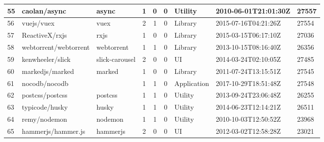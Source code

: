\begin{landscape}
\begin{table}[]
{\begin{tabular}{lllccclll}
                55 & caolan/async                        & async                 & 1                      & 0                 & 0                 & Utility           & 2010-06-01T21:01:30Z & 27557          \\ \hline
                56 & vuejs/vuex                          & vuex                  & 2                      & 1                 & 0                 & Library           & 2015-07-16T04:21:26Z & 27554          \\ \hline
                57 & ReactiveX/rxjs                      & rxjs                  & 1                      & 0                 & 0                 & Library           & 2015-03-15T06:17:10Z & 27036          \\ \hline
                58 & webtorrent/webtorrent               & webtorrent            & 1                      & 1                 & 0                 & Library           & 2013-10-15T08:16:40Z & 26356          \\ \hline
                59 & kenwheeler/slick                    & slick-carousel        & 2                      & 0                 & 0                 & UI                & 2014-03-24T02:10:05Z & 27485          \\ \hline
                60 & markedjs/marked                     & marked                & 1                      & 0                 & 0                 & Library           & 2011-07-24T13:15:51Z & 27545          \\ \hline
                61 & nocodb/nocodb                       &                       & 1                      & 1                 & 0                 & Application       & 2017-10-29T18:51:48Z & 27548          \\ \hline
                62 & postcss/postcss                     & postcss               & 1                      & 1                 & 0                 & Utility           & 2013-09-24T23:06:48Z & 26255          \\ \hline
                63 & typicode/husky                      & husky                 & 1                      & 1                 & 0                 & Utility           & 2014-06-23T12:14:21Z & 26511          \\ \hline
                64 & remy/nodemon                        & nodemon               & 1                      & 1                 & 0                 & Utility           & 2010-10-03T12:50:52Z & 23968          \\ \hline
                65 & hammerjs/hammer.js                  & hammerjs              & 2                      & 0                 & 0                 & UI                & 2012-03-02T12:58:28Z & 23021          \\ \hline

\end{tabular}}
\end{table}
\end{landscape}
